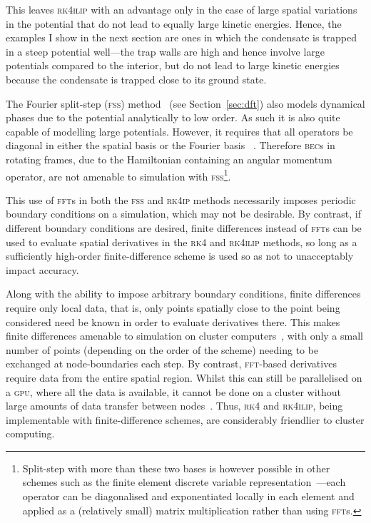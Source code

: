 This leaves \textsc{rk4ilip} with an advantage only in the case of large spatial variations in the potential that do not lead to equally large kinetic energies. Hence, the examples I show in the next section are ones in which the condensate is trapped in a steep potential well---the trap walls are high and hence involve large potentials compared to the interior, but do not lead to large kinetic energies because the condensate is trapped close to its ground state.

The Fourier split-step (\textsc{fss}) method~\cite{Muslu2005} (see Section~\ref{sec:dft}) also models dynamical phases due to the potential analytically to low order. As such it is also quite capable of modelling large potentials. However, it requires that all operators be diagonal in either the spatial basis or the Fourier basis ~\cite{Muslu2005}. Therefore \textsc{bec}s in rotating frames, due to the Hamiltonian containing an angular momentum operator, are not amenable to simulation with \textsc{fss}\footnote{Split-step with more than these two bases is however possible in other schemes such as the finite element discrete variable representation~\cite{schneider_parallel_2006}---each operator can be diagonalised and exponentiated locally in each element and applied as a (relatively small) matrix multiplication rather than using \textsc{fft}s.}.

This use of \textsc{fft}s in both the \textsc{fss} and \textsc{rk4ip} methods necessarily imposes periodic boundary conditions on a simulation, which may not be desirable. By contrast, if different boundary conditions are desired, finite differences instead of \textsc{fft}s can be used to evaluate spatial derivatives in the \textsc{rk4} and \textsc{rk4ilip} methods, so long as a sufficiently high-order finite-difference scheme is used so as not to unacceptably impact accuracy.

Along with the ability to impose arbitrary boundary conditions, finite differences require only local data, that is, only points spatially close to the point being considered need be known in order to evaluate derivatives there. This makes finite differences amenable to simulation on cluster computers~\cite[p.~100]{heroux2006parallel}, with only a small number of points (depending on the order of the scheme) needing to be exchanged at node-boundaries each step. By contrast, \textsc{fft}-based derivatives require data from the entire spatial region. Whilst this can still be parallelised on a \textsc{gpu}, where all the data is available, it cannot be done on a cluster without large amounts of data transfer between nodes~\cite{Gupta93thescalability}. Thus, \textsc{rk4} and \textsc{rk4ilip}, being implementable with finite-difference schemes, are considerably friendlier to cluster computing.

